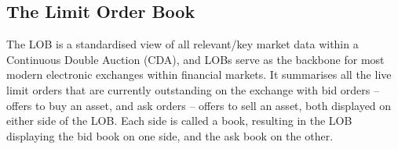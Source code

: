 \documentclass[ %
                    author={Ashwinder Khurana},
                supervisor={Prof Dave Cliff},
                    degree={MEng},
                     title={The Deeply Reinforced Trader},
                  subtitle={},
                      type={enterprise},
                      year={2020} ]{dissertation}
\begin{document}
\subsection{The Limit Order Book}
\label{subsection:The Limit Order Book}
\label{Technical:LOB}
\vspace{0.5cm}
The LOB is a standardised view of all relevant/key market data within a Continuous Double Auction (CDA), and LOBs serve as the backbone for most modern electronic exchanges within financial markets. It summarises all the live limit orders that are currently outstanding on the exchange with bid orders -- offers to buy an asset, and ask orders -- offers to sell an asset, both displayed on either side of the LOB. Each side is called a book, resulting in the LOB displaying the bid book on one side, and the ask book on the other. 
\end{document}
